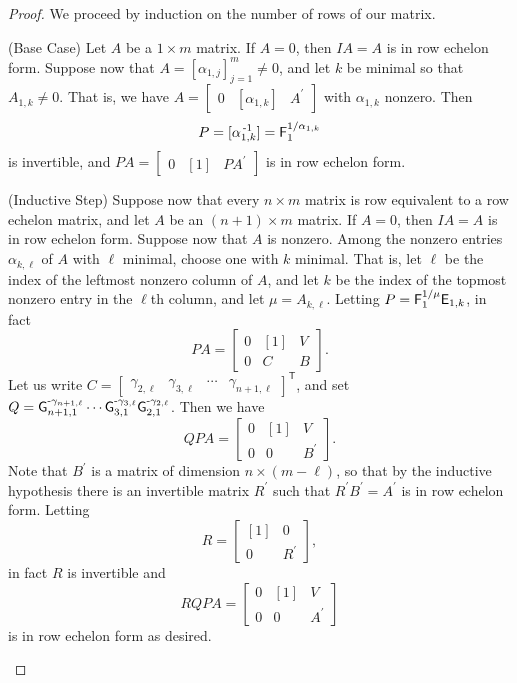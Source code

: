 \documentclass{memoir}
\begin{document}
\begin{proof}
We proceed by induction on the number of rows of our matrix.
\begin{enumerate*}
\item (Base Case) Let $A$ be a $1 \times m$ matrix. If $A = 0$, then $IA = A$ is in row echelon form. Suppose now that $A = [\alpha_{1,j}]_{j=1}^m \neq 0$, and let $k$ be minimal so that $A_{1,k} \neq 0$. That is, we have $A = \left[ \begin{array}{c|c|c} 0 & [\alpha_{1,k}] & A^\prime \end{array}\right]$ with $\alpha_{1,k}$ nonzero. Then $$P = [\alpha_{1,k}^{{\,\text{-}1}}] = \mathsf{F}_{1}^{1/\alpha_{1,k}}$$ is invertible, and $PA = \left[\begin{array}{c|c|c} 0 & [1] & PA^\prime \end{array}\right]$ is in row echelon form.
\item (Inductive Step) Suppose now that every $n \times m$ matrix is row equivalent to a row echelon matrix, and let $A$ be an $(n+1) \times m$ matrix. If $A = 0$, then $IA = A$ is in row echelon form. Suppose now that $A$ is nonzero. Among the nonzero entries $\alpha_{k,\ell}$ of $A$ with $\ell$ minimal, choose one with $k$ minimal. That is, let $\ell$ be the index of the leftmost nonzero column of $A$, and let $k$ be the index of the topmost nonzero entry in the $\ell$th column, and let $\mu = A_{k,\ell}$. Letting $P = \mathsf{F}_{1}^{1/\mu} \mathsf{E}_{{1},{k}}$, in fact $$PA = \left[ \begin{array}{c|c|c} 0 & [1] & V \\ \hline 0 & C & B \end{array} \right].$$ Let us write $C = \begin{bmatrix} \gamma_{2,\ell} & \gamma_{3,\ell} & \cdots & \gamma_{n+1,\ell} \end{bmatrix}^\mathsf{T}$, and set $Q = \mathsf{G}_{{n+1},{1}}^{\text{-}\gamma_{n+1,\ell}} \cdots \mathsf{G}_{{3},{1}}^{\text{-}\gamma_{3,\ell}} \mathsf{G}_{{2},{1}}^{\text{-}\gamma_{2,\ell}}$. Then we have \[ QPA = \left[ \begin{array}{c|c|c} 0 & [1] & V \\ \hline 0 & 0 & B^\prime \end{array} \right]. \] Note that $B^\prime$ is a matrix of dimension $n \times (m-\ell)$, so that by the inductive hypothesis there is an invertible matrix $R^\prime$ such that $R^\prime B^\prime = A^\prime$ is in row echelon form. Letting \[ R = \left[ \begin{array}{c|c} [1] & 0 \\ \hline 0 & R^\prime \end{array} \right], \] in fact $R$ is invertible and \[ RQPA = \left[ \begin{array}{c|c|c} 0 & [1] & V \\ \hline 0 & 0 & A^\prime \end{array} \right] \] is in row echelon form as desired. \qedhere
\end{enumerate*}
\end{proof}
\end{document}
